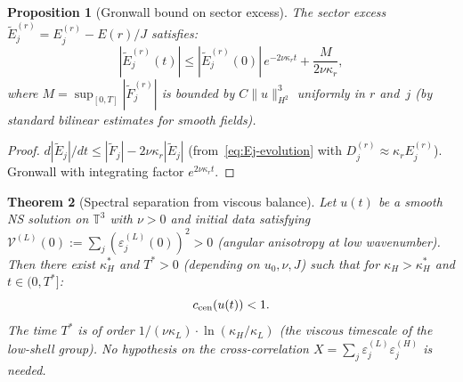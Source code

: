 \documentclass[11pt]{article}
\newtheorem{theorem}{Theorem}[section]
\newtheorem{proposition}[theorem]{Proposition}
\theoremstyle{definition}
\newcommand{\T}{\mathbb{T}}
\begin{document}
\begin{proposition}[Gronwall bound on sector excess]
\label{prop:gronwall}
The sector excess
$\tilde E_j^{(r)} = E_j^{(r)}-E(r)/J$
satisfies:
\begin{equation}\label{eq:gronwall}
|\tilde E_j^{(r)}(t)| \leq
|\tilde E_j^{(r)}(0)|\,e^{-2\nu\kappa_r t}
+ \frac{M}{2\nu\kappa_r},
\end{equation}
where $M = \sup_{[0,T]}|\tilde F_j^{(r)}|$ is
bounded by $C\|u\|_{H^2}^3$ uniformly in $r$
and~$j$ (by standard bilinear estimates for smooth
fields).
\end{proposition}

\begin{proof}
$d|\tilde E_j|/dt \leq |\tilde F_j|
-2\nu\kappa_r|\tilde E_j|$ (from~\eqref{eq:Ej-evolution}
with $D_j^{(r)}\approx\kappa_r E_j^{(r)}$).
Gronwall with integrating factor $e^{2\nu\kappa_r t}$.
\end{proof}

\begin{theorem}[Spectral separation from viscous
balance]
\label{thm:viscous-sep}
Let $u(t)$ be a smooth NS solution on $\T^3$ with
$\nu>0$ and initial data satisfying
$\mathcal{V}^{(L)}(0) := \sum_j
(\varepsilon_j^{(L)}(0))^2 > 0$ (angular anisotropy
at low wavenumber).  Then there exist
$\kappa_H^*$ and $T^*>0$ (depending on $u_0,\nu,J$)
such that for $\kappa_H>\kappa_H^*$ and
$t\in(0,T^*]$:
\begin{equation}
c_{\rm cen}(u(t)) < 1.
\end{equation}
The time $T^*$ is of order
$1/(\nu\kappa_L)\cdot\ln(\kappa_H/\kappa_L)$
(the viscous timescale of the low-shell group).
No hypothesis on the cross-correlation $X =
\sum_j\varepsilon_j^{(L)}\varepsilon_j^{(H)}$
is needed.
\end{theorem}
\end{document}
